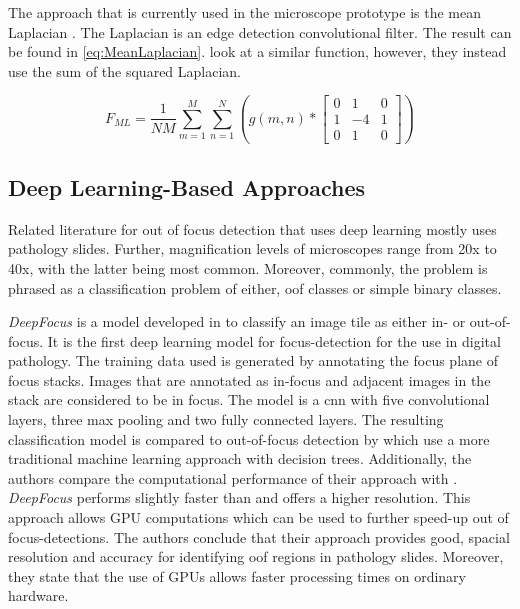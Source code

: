 The approach that is currently used in the microscope prototype is the mean Laplacian . The Laplacian is an edge detection convolutional filter. The result can be found in \autoref{eq:MeanLaplacian}. \textcite{redondo2012autofocus} look at a similar function, however, they instead use the sum of the squared Laplacian.

\begin{equation}
    \label{eq:MeanLaplacian}
    F_{ML}= \frac{1}{NM} \sum_{m=1}^{M}\sum_{n=1}^{N} (g(m,n) *
    \begin{bmatrix}
        0 & 1 & 0 \\
        1 & -4 & 1 \\
        0 & 1 & 0 
    \end{bmatrix}
    )
\end{equation}

\subsection{Deep Learning-Based Approaches}
\label{sec:Foundations:RelatedWorks:DeepLearning}

Related literature for out of focus detection that uses deep learning mostly uses pathology slides. Further, magnification levels of microscopes range from 20x to 40x, with the latter being most common. Moreover, commonly, the problem is phrased as a classification problem of either, \ac{oof} classes or simple binary classes.

\emph{DeepFocus} is a model developed in \textcite{senaras2018deepfocus} to classify an image tile as either in- or out-of-focus. It is the first deep learning model for focus-detection for the use in digital pathology. The training data used is generated by annotating the focus plane of focus stacks. Images that are annotated as in-focus and adjacent images in the stack are considered to be in focus. The model is a \ac{cnn} with five convolutional layers, three max pooling and two fully connected layers. The resulting classification model is compared to out-of-focus detection by \textcite{moleslopez2013automated} which use a more traditional machine learning approach with decision trees.
Additionally, the authors compare the computational performance of their approach with \textcite{moleslopez2013automated}. \emph{DeepFocus} performs slightly faster than \textcite{moleslopez2013automated} and offers a higher resolution. This approach allows GPU computations which can be used to further speed-up out of focus-detections.
The authors conclude that their approach provides good, spacial resolution and accuracy for identifying \ac{oof} regions in pathology slides. Moreover, they state that the use of GPUs allows faster processing times on ordinary hardware.

